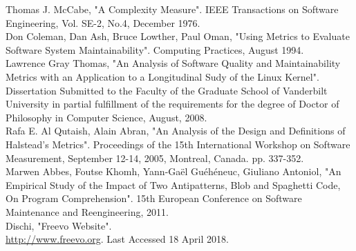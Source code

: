 \documentclass[10.5pt,journal, a4paper]{IEEEtran}
\begin{document}
\begin{thebibliography}{5}


  
 Thomas J. McCabe, "A Complexity Measure". IEEE Transactions on Software Engineering, Vol. SE-2, No.4, December 1976. \\


 Don Coleman, Dan Ash, Bruce Lowther, Paul Oman, "Using Metrics to Evaluate Software System Maintainability". Computing Practices, August 1994. \\




 Lawrence Gray Thomas, "An Analysis of Software Quality and Maintainability Metrics with an Application to a Longitudinal Sudy of the Linux Kernel". Dissertation Submitted to the Faculty of the Graduate School of Vanderbilt University in partial fulfillment of the requirements for the degree of
Doctor of Philosophy in Computer Science, August, 2008.\\




 Rafa E. Al Qutaish, Alain Abran, "An Analysis of the Design and Definitions of Halstead’s Metrics". Proceedings of the 15th International Workshop on Software Measurement, September 12-14, 2005, Montreal, Canada. pp. 337-352. \\

 Marwen Abbes, Foutse Khomh, Yann-Gaël Guéhéneuc, Giuliano Antoniol, "An Empirical Study of the Impact of Two Antipatterns, Blob and Spaghetti Code, On Program Comprehension". 15th European Conference on Software Maintenance and Reengineering, 2011. \\

 Dischi, "Freevo Website".\\
 \url{http://www.freevo.org}.
Last Accessed 18 April 2018. 


\end{thebibliography}

\onecolumn
\appendix













\end{document}
